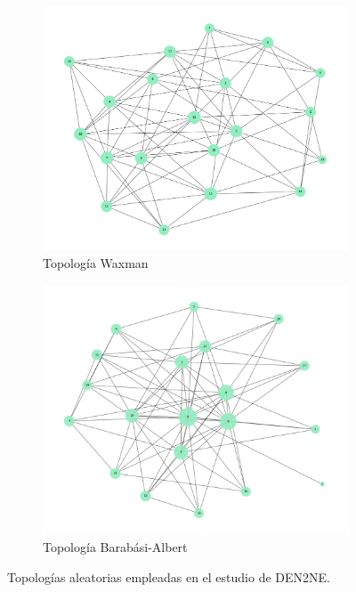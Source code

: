 \begin{figure}[ht!]
    \centering
    \begin{subfigure}[t]{0.45\textwidth}
        \centering
        \includegraphics[width=\linewidth]{fig/05_den2ne/den2ne_15a.png}
        \caption{Topología Waxman}
        \label{fig:waxman}
    \end{subfigure}
    \hfill
    \begin{subfigure}[t]{0.45\textwidth}
        \centering
        \includegraphics[width=\linewidth]{fig/05_den2ne/den2ne_15b.png}
        \caption{Topología Barabási-Albert}
        \label{fig:barabasi}
    \end{subfigure}
    \caption{Topologías aleatorias empleadas en el estudio de DEN2NE.}
    \label{fig:den2ne_15}
\end{figure}

